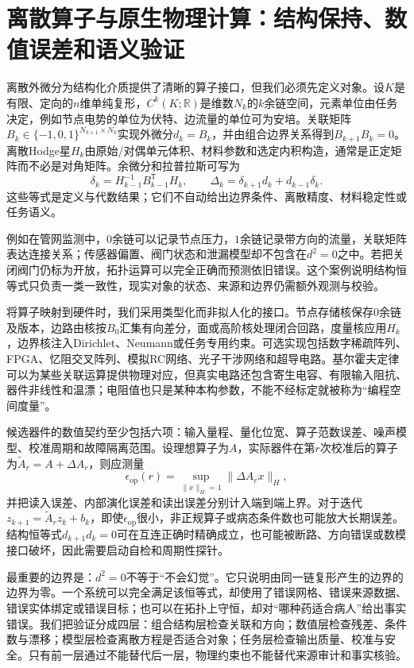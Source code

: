 \section{离散算子与原生物理计算：结构保持、数值误差和语义验证}
\label{sec:geometric_renaissance}

离散外微分为结构化介质提供了清晰的算子接口，但我们必须先定义对象。设$K$是有限、定向的$n$维单纯复形，$C^k(K;\mathbb R)$是维数$N_k$的$k$余链空间，元素单位由任务决定，例如节点电势的单位为伏特、边流量的单位可为安培。关联矩阵$B_k\in\{-1,0,1\}^{N_{k+1}\times N_k}$实现外微分$d_k=B_k$，并由组合边界关系得到$B_{k+1}B_k=0$。离散Hodge星$H_k$由原始/对偶单元体积、材料参数和选定内积构造，通常是正定矩阵而不必是对角矩阵。余微分和拉普拉斯可写为
\[
\delta_k=H_{k-1}^{-1}B_{k-1}^{\mathsf T}H_k,\qquad
\Delta_k=\delta_{k+1}d_k+d_{k-1}\delta_k .
\]
这些等式是定义与代数结果；它们不自动给出边界条件、离散精度、材料稳定性或任务语义。

例如在管网监测中，$0$余链可以记录节点压力，$1$余链记录带方向的流量，关联矩阵表达连接关系；传感器偏置、阀门状态和泄漏模型却不包含在$d^2=0$之中。若把关闭阀门仍标为开放，拓扑运算可以完全正确而预测依旧错误。这个案例说明结构恒等式只负责一类一致性，现实对象的状态、来源和边界仍需额外观测与校验。

将算子映射到硬件时，我们采用类型化而非拟人化的接口。节点存储核保存$0$余链及版本，边路由核按$B_0$汇集有向差分，面或高阶核处理闭合回路，度量核应用$H_k$，边界核注入Dirichlet、Neumann或任务专用约束。可选实现包括数字稀疏阵列、FPGA、忆阻交叉阵列、模拟RC网络、光子干涉网络和超导电路。基尔霍夫定律可以为某些关联运算提供物理对应，但真实电路还包含寄生电容、有限输入阻抗、器件非线性和温漂；电阻值也只是某种本构参数，不能不经标定就被称为“编程空间度量”。

候选器件的数值契约至少包括六项：输入量程、量化位宽、算子范数误差、噪声模型、校准周期和故障隔离范围。设理想算子为$A$，实际器件在第$r$次校准后的算子为$\widetilde A_r=A+\Delta A_r$，则应测量
\[
\epsilon_{\mathrm{op}}(r)=
\sup_{\|x\|_H=1}\|\Delta A_r x\|_H ,
\]
并把读入误差、内部演化误差和读出误差分别计入端到端上界。对于迭代$z_{k+1}=\widetilde A_r z_k+b_k$，即使$\epsilon_{\mathrm{op}}$很小，非正规算子或病态条件数也可能放大长期误差。结构恒等式$d_{k+1}d_k=0$可在互连正确时精确成立，也可能被断路、方向错误或数模接口破坏，因此需要启动自检和周期性探针。

最重要的边界是：$d^2=0$不等于“不会幻觉”。它只说明由同一链复形产生的边界的边界为零。一个系统可以完全满足该恒等式，却使用了错误网格、错误来源数据、错误实体绑定或错误目标；也可以在拓扑上守恒，却对“哪种药适合病人”给出事实错误。我们把验证分成四层：组合结构层检查关联和方向；数值层检查残差、条件数与漂移；模型层检查离散方程是否适合对象；任务层检查输出质量、校准与安全。只有前一层通过不能替代后一层，物理约束也不能替代来源审计和事实核验。

